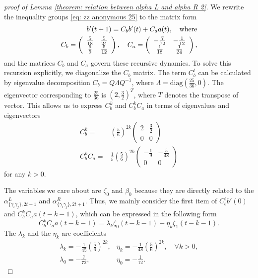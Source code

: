 \documentclass[showpacs,twocolumn,aps,prx,long bibliography,superscriptaddress,notitlepage]{revtex4-1}
\newcommand{\alpl}{\alpha_{\{\gamma_i\gamma_j\}, 2t+1}^{L}}
\newcommand{\alpr}{\alpha_{\{\gamma_i\gamma_j\}, 2t+1}^{R}}
\begin{document}
\begin{proof}[proof of Lemma \ref{theorem: relation between alpha L and alpha R 2}]
    
    We rewrite the inequality groups \eqref{eq: zz anonymous 25} to the matrix form
    \begin{align}
        b'(t+1)=C_b b'(t)+C_a a(t), \quad \text{where}\\
        C_b=\left(\begin{array}{c c}
        \frac{5}{18} & \frac{5}{24} \\ 
        \frac{5}{9} & \frac{5}{12}
        \end{array}\right), \quad C_a=\left(\begin{array}{cc}
        -\frac{7}{72} & -\frac{1}{12} \\
        \frac{1}{18} & \frac{1}{24}
        \end{array}\right),
    \end{align}
    and the matrices $C_b$ and $C_a$ govern these recursive dynamics. To solve this recursion explicitly, we diagonalize the $C_b$ matrix. 
The term $C_b^t$ can be calculated by eigenvalue decomposition $C_b=Q \Lambda Q^{-1}$, where $\Lambda=\text{diag}(\frac{25}{36},0)$. The eigenvector corresponding to $\frac{25}{36}$ is $(2, \frac{3}{2})^T$, where $T$ denotes the transpose of vector. This allows us to express $C_b^k$ and $C_b^kC_a$ in terms of eigenvalues and eigenvectors
\begin{align}
    C_b^k=&\left(\frac{5}{6}\right)^{2k}\begin{pmatrix}
2 & \frac{3}{2} \\
0 & 0
\end{pmatrix}\\
C_b^kC_a =& \frac{1}{5}\left(\frac{5}{6}\right)^{2k}\begin{pmatrix}
-\frac{1}{9} & -\frac{5}{48} \\
0 & 0
\end{pmatrix}
\end{align}
for any $k>0$. 

The variables we care about are $\zeta_0$ and $\beta_0$ because they are directly related to the $\alpl$ and $\alpr$. Thus, we mainly consider the first item of $C_b^t b'(0)$ and $C_b^kC_aa(t-k-1)$, which can be expressed in the following form
\begin{equation}
    C_b^kC_aa(t-k-1) = \lambda_k \zeta_0(t-k-1)+\eta_k \zeta_1(t-k-1).
\end{equation}
The $\lambda_k$ and the $\eta_k$ are coefficients 
\begin{equation}
    \begin{array}{ll}
\lambda_k=-\frac{1}{45}\left(\frac{5}{6}\right)^{2 k}, & \eta_k=-\frac{1}{48}\left(\frac{5}{6}\right)^{2 k}, \quad \forall k>0,  \\
\lambda_0=-\frac{7}{72}, & \eta_0=-\frac{1}{12}.
\end{array}
\end{equation}


\end{proof}
\end{document}
